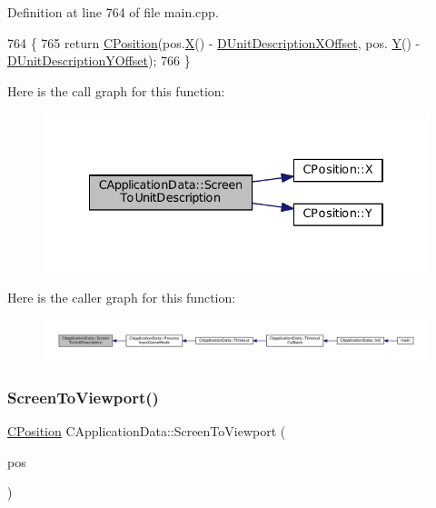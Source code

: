 Definition at line 764 of file main.\+cpp.


\begin{DoxyCode}
764                                                                        \{
765     \textcolor{keywordflow}{return} \hyperlink{classCPosition}{CPosition}(pos.\hyperlink{classCPosition_a9a6b94d3b91df1492d166d9964c865fc}{X}() - \hyperlink{classCApplicationData_a5653b5d0eff32ccd540ad60f5c331c24}{DUnitDescriptionXOffset}, pos.
      \hyperlink{classCPosition_a1aa8a30e2f08dda1f797736ba8c13a87}{Y}() - \hyperlink{classCApplicationData_a6c60b2da482699f1d998acfe24fec332}{DUnitDescriptionYOffset});
766 \}
\end{DoxyCode}
Here is the call graph for this function\+:
\nopagebreak
\begin{figure}[H]
\begin{center}
\leavevmode
\includegraphics[width=334pt]{classCApplicationData_a5400b710281ac2671d8d76aa442124ec_cgraph}
\end{center}
\end{figure}
Here is the caller graph for this function\+:
\nopagebreak
\begin{figure}[H]
\begin{center}
\leavevmode
\includegraphics[width=350pt]{classCApplicationData_a5400b710281ac2671d8d76aa442124ec_icgraph}
\end{center}
\end{figure}
\hypertarget{classCApplicationData_aebd3ae4cfd74962413024f1649233f08}{}\label{classCApplicationData_aebd3ae4cfd74962413024f1649233f08} 
\subsubsection{\texorpdfstring{Screen\+To\+Viewport()}{ScreenToViewport()}}
{\footnotesize\ttfamily \hyperlink{classCPosition}{C\+Position} C\+Application\+Data\+::\+Screen\+To\+Viewport (\begin{DoxyParamCaption}\item[{const \hyperlink{classCPosition}{C\+Position} \&}]{pos }\end{DoxyParamCaption})\hspace{0.3cm}{\ttfamily [protected]}}



